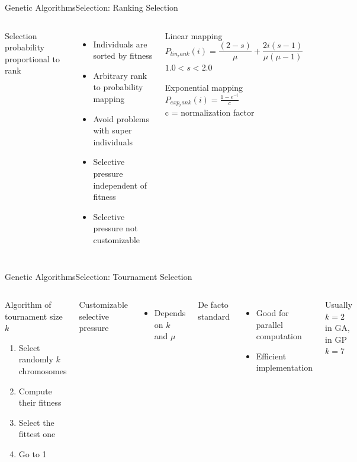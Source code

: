 \documentclass[10pt,compress]{beamer} %
\begin{document}
\begin{frame}{Genetic Algorithms}{Selection: Ranking Selection}
    \begin{columns}
	Selection probability proportional to rank
	\begin{itemize}
		\item Individuals are sorted by fitness
		\item Arbitrary rank to probability mapping
		\item Avoid problems with super individuals
		\item Selective pressure independent of fitness
		\item Selective pressure not customizable
  	\end{itemize}
	\begin{center}
	\small{
	\begin{block}{Linear mapping}
	\begin{equation*}
	P_{lin_rank}(i)=\frac{(2-s)}{\mu} + \frac{2i(s-1)}{\mu (\mu -1)}
	\end{equation*}
	$1.0 < s < 2.0$
	\end{block}

	\begin{block}{Exponential mapping}
	$P_{exp_rank}(i)=\frac{1-e^{-i}}{c}$\\
	c = normalization factor
	\end{block}
	}
	\end{center}
	\end{columns}
\end{frame}

\begin{frame}{Genetic Algorithms}{Selection: Tournament Selection}
    \begin{columns}
	   \begin{block}{Algorithm of tournament size $k$}
	\begin{enumerate}
		\item Select randomly $k$ chromosomes
		\item Compute their fitness
		\item Select the fittest one
		\item Go to 1
  	\end{enumerate}
	\end{block}
	Customizable selective pressure
	\begin{itemize}
		\item Depends on $k$ and $\mu$
	\end{itemize}
	De facto standard
	\begin{itemize}
		\item Good for parallel computation
		\item Efficient implementation
	\end{itemize}
	Usually $k=2$ in GA, in GP $k=7$
	\end{columns}
\end{frame}
\end{document}
